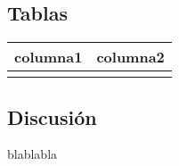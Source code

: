 \documentclass[conference,spanish,a4paper,10pt,oneside,final]{tfmpd}
\begin{document}
\subsection{Tablas}
\begin{tabular}{cc}
\hline columna1 & columna2 \\ 
\hline  &  \\ 
\hline 
\end{tabular} 

%
%
%
%
\subsection{Discusión}
blablabla
%
%
%
%
%
%
%

\end{document}
